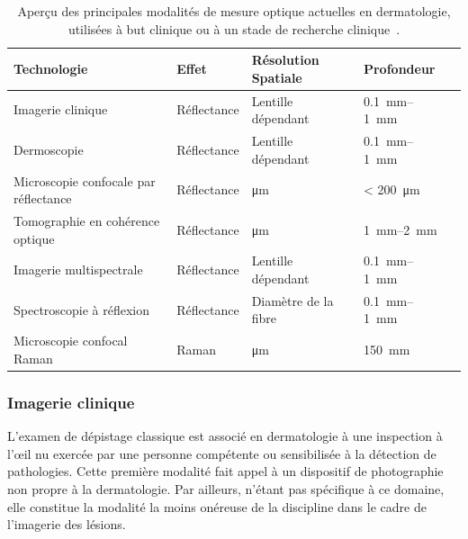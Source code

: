 \begin{table}[H]
\begin{tabular}{lllll}
    \toprule
    \textbf{Technologie}                        & \textbf{Effet}    & \textbf{Résolution Spatiale} & \textbf{Profondeur}                \\ \hline
    Imagerie clinique                           & Réflectance       & Lentille dépendant           & \SIrange{0.1}{1}{\milli\metre}     \\
    Dermoscopie                                 & Réflectance       & Lentille dépendant           & \SIrange{0.1}{1}{\milli\metre}     \\
    Microscopie confocale par réflectance       & Réflectance       & \si{\micro\metre}            & \textless{} \SI{200}{\micro\metre} \\
    Tomographie en cohérence optique            & Réflectance       & \si{\micro\metre}            & \SIrange{1}{2}{\milli\metre}       \\
    Imagerie multispectrale                     & Réflectance       & Lentille dépendant           & \SIrange{0.1}{1}{\milli\metre}     \\
    Spectroscopie à réflexion                   & Réflectance       & Diamètre de la fibre         & \SIrange{0.1}{1}{\milli\metre}     \\
    Microscopie confocal Raman                  & Raman             & \si{\micro\metre}            & \SI{150}{\milli\metre}             \\
    \bottomrule
\end{tabular}
\caption{Aperçu des principales modalités de mesure optique actuelles en dermatologie, utilisées à but clinique ou à un stade de recherche clinique~\cite{Kollias2002}.}
\label{tab:light_absorption}
\end{table}\par

\subsubsection{Imagerie clinique}
L’examen de dépistage classique est associé en dermatologie à une inspection à l’œil nu exercée par une personne compétente ou sensibilisée à la détection de pathologies. Cette première modalité fait appel à un dispositif de photographie non propre à la dermatologie. Par ailleurs, n’étant pas spécifique à ce domaine, elle constitue la modalité la moins onéreuse de la discipline dans le cadre de l’imagerie des lésions.\par

